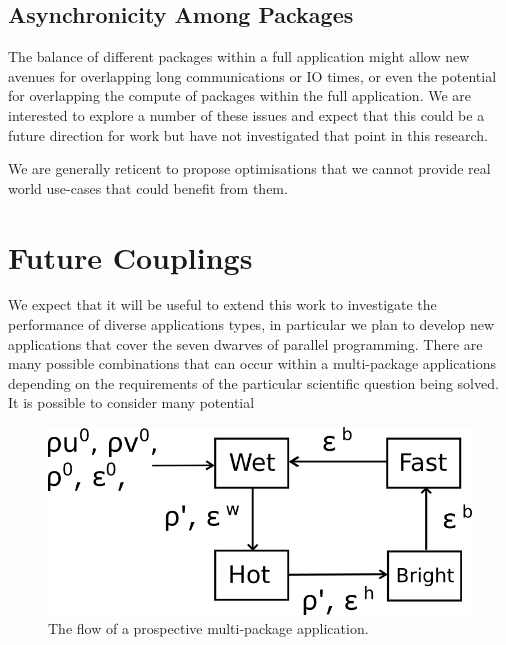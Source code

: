 \documentclass[runningheads,a4paper]{llncs}
\begin{document}

\subsection{Asynchronicity Among Packages}

The balance of different packages within a full application might allow new avenues for overlapping long communications or IO times, or even the potential for overlapping the compute of packages within the full application. We are interested to explore a number of these issues and expect that this could be a future direction for work but have not investigated that point in this research.

We are generally reticent to propose optimisations that we cannot provide real world use-cases that could benefit from them. 

\section{Future Couplings}

We expect that it will be useful to extend this work to investigate the performance of diverse applications types, in particular we plan to develop new applications that cover the seven dwarves of parallel programming. There are many possible combinations that can occur within a multi-package applications depending on the requirements of the particular scientific question being solved. It is possible to consider many potential 

\begin{figure}
  \centering
  \includegraphics[width=0.6\linewidth]{all-four-flow}
  \caption{The flow of a prospective multi-package application.}
  \label{fig:multi-package-flow}
\end{figure}
\end{document}
